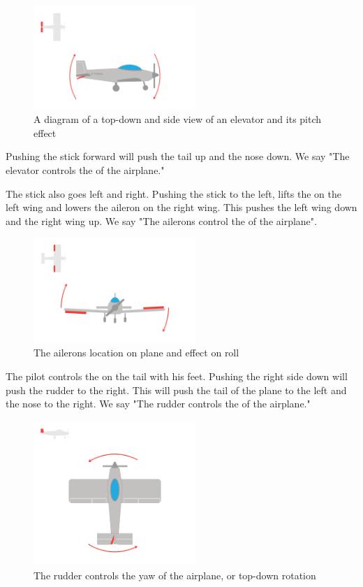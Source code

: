 \begin{figure}[H]
    \centering
    \includegraphics[width=0.55\textwidth]{elevator.png}
    \caption{A diagram of a top-down and side view of an elevator and its pitch effect}
    \label{fig:elevator}
\end{figure}

Pushing the stick forward will push the tail up and the nose down.  We say "The elevator controls the  of the airplane."

The stick also goes left and right. Pushing the stick to the left,  lifts the  on the left wing and lowers the aileron on the right wing.  This pushes the left wing down and
the right wing up.  We say "The ailerons control the   of the airplane".

\begin{figure}[H]
    \centering
    \includegraphics[width=0.55\textwidth]{ailerons.png}
    \caption{The ailerons location on plane and effect on roll}
    \label{fig:ailerons}
\end{figure}


The pilot controls the  on the tail with his feet. Pushing the right side down will push the rudder to the right.  This will push the tail of the plane to the left and the
nose to the right. We say "The rudder controls the  of the airplane."

\begin{figure}[H]
    \centering
    \includegraphics[width=0.55\textwidth]{rudder.png}
    \caption{The rudder controls the yaw of the airplane, or top-down rotation}
    \label{fig:rudderYaw}
\end{figure}

